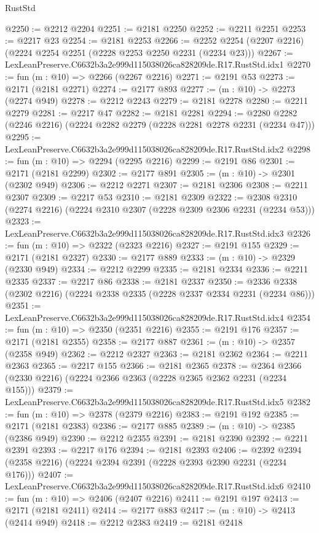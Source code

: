 \begin{lexlean}{RustStd}
\begin{coremodule}
@2250 := @2212 @2204
@2251 := @2181 @2250
@2252 := @2211 @2251
@2253 := @2217 @23
@2254 := @2181 @2253
@2266 := @2252 @2254 (@2207 @2216) (@2224 @2254 @2251 (@2228 @2253 @2250 @2231 (@2234 @23)))
@2267 := LexLeanPreserve.C6632b3a2e999d115038026ca828209de.R17.RustStd.idx1
@2270 := fun (m : @10) => @2266 (@2267 @2216)
@2271 := @2191 @53
@2273 := @2171 (@2181 @2271)
@2274 := @2177 @893
@2277 := (m : @10) -> @2273 (@2274 @949)
@2278 := @2212 @2243
@2279 := @2181 @2278
@2280 := @2211 @2279
@2281 := @2217 @47
@2282 := @2181 @2281
@2294 := @2280 @2282 (@2246 @2216) (@2224 @2282 @2279 (@2228 @2281 @2278 @2231 (@2234 @47)))
@2295 := LexLeanPreserve.C6632b3a2e999d115038026ca828209de.R17.RustStd.idx2
@2298 := fun (m : @10) => @2294 (@2295 @2216)
@2299 := @2191 @86
@2301 := @2171 (@2181 @2299)
@2302 := @2177 @891
@2305 := (m : @10) -> @2301 (@2302 @949)
@2306 := @2212 @2271
@2307 := @2181 @2306
@2308 := @2211 @2307
@2309 := @2217 @53
@2310 := @2181 @2309
@2322 := @2308 @2310 (@2274 @2216) (@2224 @2310 @2307 (@2228 @2309 @2306 @2231 (@2234 @53)))
@2323 := LexLeanPreserve.C6632b3a2e999d115038026ca828209de.R17.RustStd.idx3
@2326 := fun (m : @10) => @2322 (@2323 @2216)
@2327 := @2191 @155
@2329 := @2171 (@2181 @2327)
@2330 := @2177 @889
@2333 := (m : @10) -> @2329 (@2330 @949)
@2334 := @2212 @2299
@2335 := @2181 @2334
@2336 := @2211 @2335
@2337 := @2217 @86
@2338 := @2181 @2337
@2350 := @2336 @2338 (@2302 @2216) (@2224 @2338 @2335 (@2228 @2337 @2334 @2231 (@2234 @86)))
@2351 := LexLeanPreserve.C6632b3a2e999d115038026ca828209de.R17.RustStd.idx4
@2354 := fun (m : @10) => @2350 (@2351 @2216)
@2355 := @2191 @176
@2357 := @2171 (@2181 @2355)
@2358 := @2177 @887
@2361 := (m : @10) -> @2357 (@2358 @949)
@2362 := @2212 @2327
@2363 := @2181 @2362
@2364 := @2211 @2363
@2365 := @2217 @155
@2366 := @2181 @2365
@2378 := @2364 @2366 (@2330 @2216) (@2224 @2366 @2363 (@2228 @2365 @2362 @2231 (@2234 @155)))
@2379 := LexLeanPreserve.C6632b3a2e999d115038026ca828209de.R17.RustStd.idx5
@2382 := fun (m : @10) => @2378 (@2379 @2216)
@2383 := @2191 @192
@2385 := @2171 (@2181 @2383)
@2386 := @2177 @885
@2389 := (m : @10) -> @2385 (@2386 @949)
@2390 := @2212 @2355
@2391 := @2181 @2390
@2392 := @2211 @2391
@2393 := @2217 @176
@2394 := @2181 @2393
@2406 := @2392 @2394 (@2358 @2216) (@2224 @2394 @2391 (@2228 @2393 @2390 @2231 (@2234 @176)))
@2407 := LexLeanPreserve.C6632b3a2e999d115038026ca828209de.R17.RustStd.idx6
@2410 := fun (m : @10) => @2406 (@2407 @2216)
@2411 := @2191 @197
@2413 := @2171 (@2181 @2411)
@2414 := @2177 @883
@2417 := (m : @10) -> @2413 (@2414 @949)
@2418 := @2212 @2383
@2419 := @2181 @2418

\end{coremodule}
\end{lexlean}
